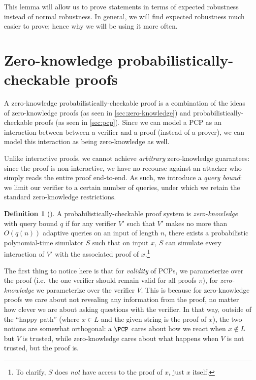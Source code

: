\documentclass[english,12pt]{reedthesis}
\theoremstyle{plain}
\theoremstyle{definition}
\newtheorem{defn}[defn]{Definition}
\theoremstyle{remark}
\begin{document}
This lemma will allow us to prove statements in terms of expected robustness
instead of normal robustness. In general, we will find expected robustness much
easier to prove; hence why we will be using it more often.

\section{Zero-knowledge probabilistically-checkable proofs}\label{sec:pzkpcp}

A zero-knowledge probabilistically-checkable proof is a combination of the ideas
of zero-knowledge proofs (as seen in \cref{sec:zero-knowledge}) and
probabilistically-checkable proofs (as seen in \cref{sec:pcp}). Since we can
model a PCP as an interaction between between a verifier and a proof (instead of
a prover), we can model this interaction as being zero-knowledge as well.

Unlike interactive proofs, we cannot achieve \emph{arbitrary} zero-knowledge
guarantees: since the proof is non-interactive, we have no recourse against an
attacker who simply reads the entire proof end-to-end. As such, we introduce a
\emph{query bound}: we limit our verifier to a certain number
of queries, under which we retain the standard zero-knowledge restrictions.

\begin{defn}[{\cite[Def.\ 8.6]{GOS24}}]\label{def:pzkpcp}
  A probabilistically-checkable proof system is \emph{zero-knowledge} with query
  bound $q$ if for any verifier $V'$ such that $V'$ makes no more than $O(q(n))$
  adaptive queries on an input of length $n$, there exists a probabilistic
  polynomial-time simulator $S$ such that on input $x$, $S$ can simulate every
  interaction of $V'$ with the associated proof of $x$.\footnote{To clarify, $S$
    does \emph{not} have access to the proof of $x$, just $x$ itself.}
\end{defn}

The first thing to notice here is that for \emph{validity} of PCPs, we
parameterize over the proof (i.e.\ the one verifier should remain valid for all
proofs $\pi$), for \emph{zero-knowledge} we parameterize over the verifier $V$.
This is because for zero-knowledge proofs we care about not revealing any
information from the proof, no matter how clever we are about asking questions
with the verifier. In that way, outside of the ``happy path'' (where $x \in L$ and
the given string is the proof of $x$), the two notions are somewhat orthogonal:
a $\PCP$ cares about how we react when $x \notin L$ but $V$ is trusted, while
zero-knowledge cares about what happens when $V$ is not trusted, but the proof
is.
\end{document}
